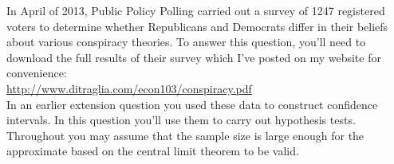 \documentclass[addpoints,12pt]{exam}\usepackage[]{graphicx}\usepackage[]{xcolor}
\makeatletter
\newcommand{\hlnum}[1]{\textcolor[rgb]{0.686,0.059,0.569}{#1}}%
\newcommand{\hlopt}[1]{\textcolor[rgb]{0,0,0}{#1}}%
\newcommand{\hldef}[1]{\textcolor[rgb]{0.345,0.345,0.345}{#1}}%
\newcommand{\hlkwb}[1]{\textcolor[rgb]{0.69,0.353,0.396}{#1}}%
\newcommand{\hlkwd}[1]{\textcolor[rgb]{0.737,0.353,0.396}{\textbf{#1}}}%
\newenvironment{kframe}{%
 \def\at@end@of@kframe{}%
 \ifinner\ifhmode%
  \def\at@end@of@kframe{\end{minipage}}%
  \begin{minipage}{\columnwidth}%
 \fi\fi%
 \def\FrameCommand##1{\hskip\@totalleftmargin \hskip-\fboxsep
 \colorbox{shadecolor}{##1}\hskip-\fboxsep
     \hskip-\linewidth \hskip-\@totalleftmargin \hskip\columnwidth}%
 \MakeFramed {\advance\hsize-\width
   \@totalleftmargin\z@ \linewidth\hsize
   \@setminipage}}%
 {\par\unskip\endMakeFramed%
 \at@end@of@kframe}
\newenvironment{knitrout}{}{} %
\makeatother
\begin{document}
\begin{questions}

\question In April of 2013, Public Policy Polling carried out a survey of 1247 registered voters to determine whether Republicans and Democrats differ in their beliefs about various conspiracy theories. To answer this question, you'll need to download the full results of their survey which I've posted on my website for convenience:\\
\url{http://www.ditraglia.com/econ103/conspiracy.pdf}\\
In an earlier extension question you used these data to construct confidence intervals. In this question you'll use them to carry out hypothesis tests. Throughout you may assume that the sample size is large enough for the approximate based on the central limit theorem to be valid.
\end{questions}
\end{document}
